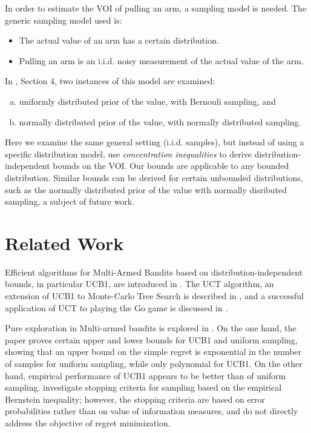 \documentclass{article}
\begin{document}
In order to estimate the VOI of pulling an arm, a sampling model is
needed.  The generic sampling model used is: 
\begin{itemize}
\item The actual value of an arm has a certain distribution.
\item Pulling an arm is an i.i.d. noisy measurement of the actual
  value of the arm.
\end{itemize}
In \cite{HayRussell.MCTS}, Section 4, two instances of this model are
examined:
\begin{enumerate}[a)]
\item uniformly distributed prior of the value, with Bernouli
  sampling, and 
\item normally distributed prior of the value, with normally
  distributed sampling.
\end{enumerate}
Here we examine the same general setting (i.i.d. samples), but instead
of using a specific distribution model, use {\em concentration
inequalities} to derive distribution-independent bounds on the
VOI. Our bounds are applicable to any bounded distribution. Similar
bounds can be derived for certain unbounded distributions, such as the
normally distributed prior of the value with normally disributed
sampling, a subject of future work.

\section{Related Work}

Efficient algorithms for Multi-Armed Bandits based on
distribution-independent bounds, in particular UCB1, are introduced in
\cite{Auer.ucb}. The UCT algorithm, an extension of UCB1 to
Monte-Carlo Tree Search is described in \cite{Kocsis.uct}, and a successful
application of UCT to playing the Go game is discussed in
\cite{Gelly.mogo}.

Pure exploration in Multi-armed bandits is explored in
\cite{Bubeck.pure}. On the one hand, the paper proves certain upper
and lower bounds for UCB1 and uniform sampling, showing that an upper
bound on the simple regret is exponential in the number of samples for
uniform sampling, while only polynomial for UCB1. On the other hand,
empirical performance of UCB1 appears to be better than of uniform
sampling. \cite{Mnih.bernstop} investigate stopping criteria for
sampling based on the empirical Bernstein inequality; however, the
stopping criteria are based on error probabilities rather than on
value of information measures, and do not directly address the
objective of regret minimization.
\end{document}
